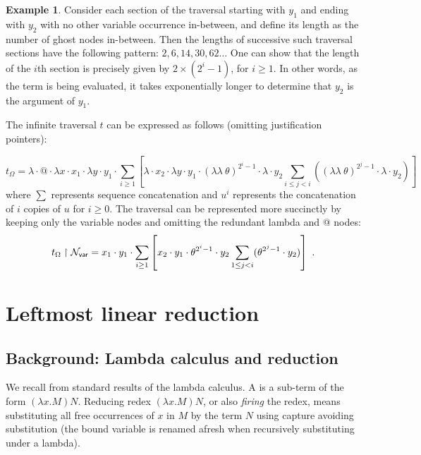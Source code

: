 \documentclass{article}
\theoremstyle{plain}
\theoremstyle{definition}
\newtheorem{example}{Example}[section]
\theoremstyle{remark}
\newcommand\Nodes{\mathcal{N}}%
\newcommand\NodesVar{\Nodes_{\sf var}}%
\newcommand{\ghostlmd}{{\lambda\!\!\lambda}}
\newcommand{\ghostvar}{\theta}
\begin{document}
\begin{example}
Consider each section of the traversal starting with $y_1$ and ending with $y_2$ with no other variable occurrence in-between, and define its length as the number of ghost nodes in-between. Then the lengths of successive such traversal sections have the following pattern: $2,6,14,30,62\ldots$
One can show that the length of the $i$th section is precisely given by $2\times(2^i-1)$, for $i\geq1$.
In other words, as the term is being evaluated, it takes exponentially longer to determine that $y_2$ is the argument of $y_1$.

The infinite traversal $t$ can be expressed as follows (omitting justification pointers):

\begin{equation*}
t_\Omega = \lambda \cdot @ \cdot \lambda x \cdot  x_1 \cdot \lambda y \cdot y_1
\cdot  \sum_{i\geq 1}
    \left[
        \lambda \cdot x_2 \cdot \lambda y \cdot y_1 \cdot
         {(\ghostlmd\ \ghostvar)}^{2^i -1}\cdot \lambda \cdot y_2
             \sum_{i\leq j<i}
                \left(
                    {(\ghostlmd\ \ghostvar)}^{2^j -1}
                    \cdot
                    \lambda \cdot y_2
                \right)
    \right]
\end{equation*}
where $\sum$ represents sequence concatenation and $u^i$ represents the concatenation of $i$ copies of $u$ for $i\geq 0$.
The traversal can be represented more succinctly by keeping only the variable nodes and omitting the redundant lambda and @ nodes:
\begin{equation*}
    t_\Omega \filter \NodesVar =  x_1 \cdot y_1
    \cdot  \sum_{i\geq 1}
        \left[
            x_2 \cdot y_1 \cdot
             \ghostvar^{2^i -1}\cdot y_2
                 \sum_{1\leq j <i} (\ghostvar^{2^j -1} \cdot y_2)
        \right] \ .
\end{equation*}
\end{example}

\section{Leftmost linear reduction}
\label{sec:leftmostlinearred}

\subsection{Background: Lambda calculus and reduction}
We recall from standard results of the lambda calculus.
A  is a sub-term of the form $(\lambda x. M) N$.
Reducing redex $(\lambda x. M) N$, or also \emph{firing} the redex, means substituting all free occurrences of $x$ in $M$ by the term $N$ using capture avoiding substitution (the bound variable is renamed afresh when recursively substituting under a lambda).
\end{document}
